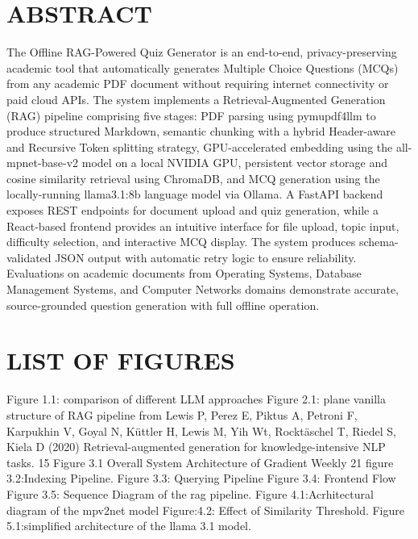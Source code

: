 \documentclass[12pt,a4paper]{report}
\begin{document}
\chapter*{ABSTRACT}
The Offline RAG-Powered Quiz Generator is an end-to-end, privacy-preserving academic tool that automatically generates Multiple Choice Questions (MCQs) from any academic PDF document without requiring internet connectivity or paid cloud APIs. The system implements a Retrieval-Augmented Generation (RAG) pipeline comprising five stages: PDF parsing using pymupdf4llm to produce structured Markdown, semantic chunking with a hybrid Header-aware and Recursive Token splitting strategy, GPU-accelerated embedding using the all-mpnet-base-v2 model on a local NVIDIA GPU, persistent vector storage and cosine similarity retrieval using ChromaDB, and MCQ generation using the locally-running llama3.1:8b language model via Ollama. A FastAPI backend exposes REST endpoints for document upload and quiz generation, while a React-based frontend provides an intuitive interface for file upload, topic input, difficulty selection, and interactive MCQ display. The system produces schema-validated JSON output with automatic retry logic to ensure reliability. Evaluations on academic documents from Operating Systems, Database Management Systems, and Computer Networks domains demonstrate accurate, source-grounded question generation with full offline operation.
























\chapter*{LIST OF FIGURES}


Figure 1.1: comparison of different LLM approaches
Figure 2.1: plane vanilla structure of RAG pipeline from Lewis P, Perez E, Piktus A, Petroni     F,       Karpukhin V, Goyal N, Küttler H, Lewis M, Yih Wt, Rocktäschel T, Riedel S, Kiela D (2020) Retrieval-augmented generation for knowledge-intensive NLP tasks. 15
Figure 3.1 Overall System Architecture of Gradient Weekly 21
figure 3.2:Indexing Pipeline.
Figure 3.3: Querying Pipeline
Figure 3.4: Frontend Flow
Figure 3.5: Sequence Diagram of the rag pipeline.
Figure 4.1:Acrhitectural diagram of the mpv2net model
Figure:4.2: Effect of Similarity Threshold.
Figure 5.1:simplified architecture  of the llama 3.1 model.
\end{document}
